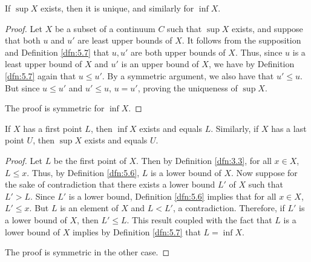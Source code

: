 \documentclass[../main.tex]{subfiles}
\begin{document}
\begin{exercise}\label{exr:5.8}
    If $\sup X$ exists, then it is unique, and similarly for $\inf X$.
    \begin{proof}
        Let $X$ be a subset of a continuum $C$ such that $\sup X$ exists, and suppose that both $u$ and $u'$ are least upper bounds of $X$. It follows from the supposition and Definition \ref{dfn:5.7} that $u,u'$ are both upper bounds of $X$. Thus, since $u$ is a least upper bound of $X$ and $u'$ is an upper bound of $X$, we have by Definition \ref{dfn:5.7} again that $u\leq u'$. By a symmetric argument, we also have that $u'\leq u$. But since $u\leq u'$ and $u'\leq u$, $u=u'$, proving the uniqueness of $\sup X$.\par
        The proof is symmetric for $\inf X$.
    \end{proof}
\end{exercise}

\begin{exercise}\label{exr:5.9}
    If $X$ has a first point $L$, then $\inf X$ exists and equals $L$. Similarly, if $X$ has a last point $U$, then $\sup X$ exists and equals $U$.
    \begin{proof}
        Let $L$ be the first point of $X$. Then by Definition \ref{dfn:3.3}, for all $x\in X$, $L\leq x$. Thus, by Definition \ref{dfn:5.6}, $L$ is a lower bound of $X$. Now suppose for the sake of contradiction that there exists a lower bound $L'$ of $X$ such that $L'>L$. Since $L'$ is a lower bound, Definition \ref{dfn:5.6} implies that for all $x\in X$, $L'\leq x$. But $L$ is an element of $X$ and $L<L'$, a contradiction. Therefore, if $L'$ is a lower bound of $X$, then $L'\leq L$. This result coupled with the fact that $L$ is a lower bound of $X$ implies by Definition \ref{dfn:5.7} that $L=\inf X$.\par
        The proof is symmetric in the other case.
    \end{proof}
\end{exercise}
\end{document}
